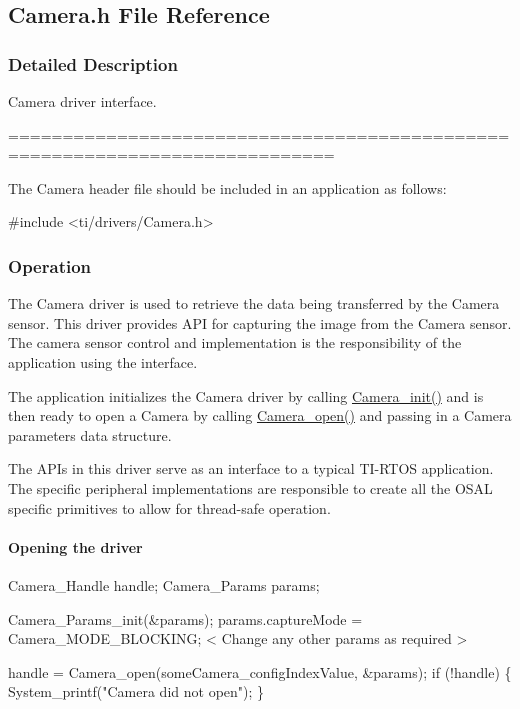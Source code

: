 \subsection{Camera.\+h File Reference}
\label{_camera_8h}


\subsubsection{Detailed Description}
Camera driver interface. 

============================================================================

The Camera header file should be included in an application as follows\+: 
\begin{DoxyCode}
\textcolor{preprocessor}{#include <ti/drivers/Camera.h>}
\end{DoxyCode}


\subsubsection*{Operation}

The Camera driver is used to retrieve the data being transferred by the Camera sensor. This driver provides A\+P\+I for capturing the image from the Camera sensor. The camera sensor control and implementation is the responsibility of the application using the interface.

The application initializes the Camera driver by calling \hyperlink{_camera_8h_ab0208c74b70ac5b50cb26c36f1f3ebad}{Camera\+\_\+init()} and is then ready to open a Camera by calling \hyperlink{_camera_8h_a5bd1f515c97e0f598ff554c663bc6cde}{Camera\+\_\+open()} and passing in a Camera parameters data structure.

The A\+P\+Is in this driver serve as an interface to a typical T\+I-\/\+R\+T\+O\+S application. The specific peripheral implementations are responsible to create all the O\+S\+A\+L specific primitives to allow for thread-\/safe operation.

\paragraph*{Opening the driver}


\begin{DoxyCode}
Camera_Handle      handle;
Camera_Params      params;

Camera_Params_init(&params);
params.captureMode       =  Camera_MODE_BLOCKING;
< Change any other params as required >

handle = Camera_open(someCamera\_configIndexValue, &params);
\textcolor{keywordflow}{if} (!handle) \{
    System\_printf(\textcolor{stringliteral}{"Camera did not open"});
\}
\end{DoxyCode}


